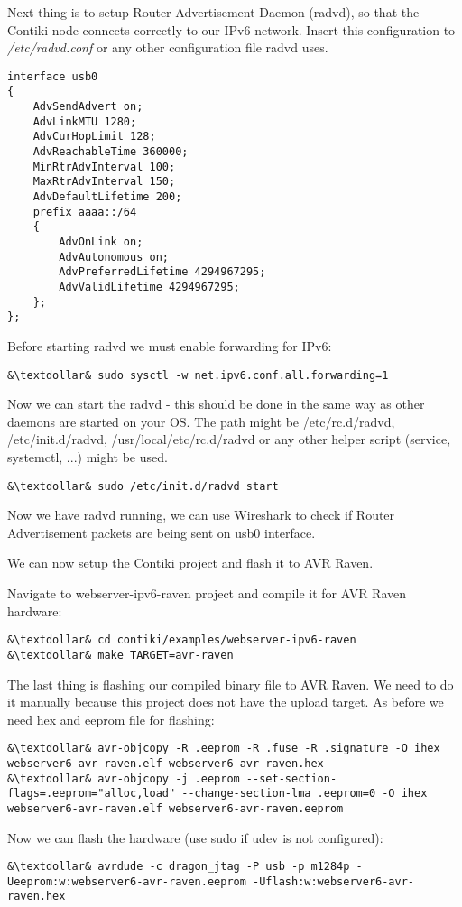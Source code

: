 \documentclass{article}
\begin{document}
Next thing is to setup Router Advertisement Daemon (radvd), so that the Contiki node connects correctly to our IPv6 network.
Insert this configuration to {\it{/etc/radvd.conf}} or any other configuration file radvd uses.
\begin{lstlisting}
interface usb0
{
    AdvSendAdvert on;
    AdvLinkMTU 1280;
    AdvCurHopLimit 128;
    AdvReachableTime 360000;
    MinRtrAdvInterval 100;
    MaxRtrAdvInterval 150;
    AdvDefaultLifetime 200;
    prefix aaaa::/64
    {
        AdvOnLink on;
        AdvAutonomous on;
        AdvPreferredLifetime 4294967295; 
        AdvValidLifetime 4294967295; 
    };
};
\end{lstlisting}
Before starting radvd we must enable forwarding for IPv6:
\begin{lstlisting}
&\textdollar& sudo sysctl -w net.ipv6.conf.all.forwarding=1
\end{lstlisting}
Now we can start the radvd - this should be done in the same way as other daemons are started on your OS.
The path might be /etc/rc.d/radvd, /etc/init.d/radvd, /usr/local/etc/rc.d/radvd or any other helper script (service, systemctl, ...) might be used.
\begin{lstlisting}
&\textdollar& sudo /etc/init.d/radvd start
\end{lstlisting}

Now we have radvd running, we can use Wireshark to check if Router Advertisement packets are being sent on usb0 interface.


We can now setup the Contiki project and flash it to AVR Raven.

Navigate to webserver-ipv6-raven project and compile it for AVR Raven hardware:
\begin{lstlisting}
&\textdollar& cd contiki/examples/webserver-ipv6-raven
&\textdollar& make TARGET=avr-raven
\end{lstlisting}


The last thing is flashing our compiled binary file to AVR Raven. We need to do it manually because this project does not have the upload target.
As before we need hex and eeprom file for flashing:
\begin{lstlisting}
&\textdollar& avr-objcopy -R .eeprom -R .fuse -R .signature -O ihex webserver6-avr-raven.elf webserver6-avr-raven.hex
&\textdollar& avr-objcopy -j .eeprom --set-section-flags=.eeprom="alloc,load" --change-section-lma .eeprom=0 -O ihex webserver6-avr-raven.elf webserver6-avr-raven.eeprom
\end{lstlisting}
Now we can flash the hardware (use sudo if udev is not configured):
\begin{lstlisting}
&\textdollar& avrdude -c dragon_jtag -P usb -p m1284p -Ueeprom:w:webserver6-avr-raven.eeprom -Uflash:w:webserver6-avr-raven.hex
\end{lstlisting}
\end{document}
